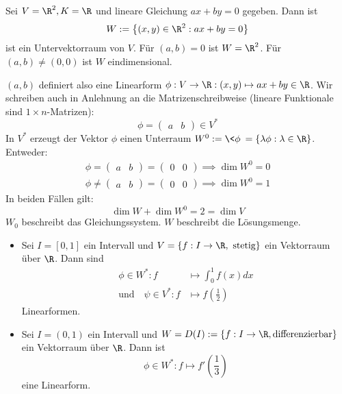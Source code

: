 \documentclass{mycourse}
\begin{document}
\begin{ex}
Sei $V=\R^2, K=\R$ und lineare Gleichung $ax+by=0$ gegeben.
Dann ist
\[
W:=\left\{(x, y) \in \R^2:ax+by=0\right\}
\]
ist ein Untervektorraum von $V$. 
Für $(a,b)=0$ ist $W=\R^2$.
Für $(a,b)\neq (0,0)$ ist $W$ eindimensional.

$(a,b)$ definiert also eine Linearform $\phi:V\to\R:(x,y)\mapsto ax+by\in\R$.
Wir schreiben auch in Anlehnung an die Matrizenschreibweise (lineare Funktionale sind $1\times n$-Matrizen):
\[
	\phi=\begin{pmatrix}a&b\end{pmatrix}\in V^*
\]
In $V^*$ erzeugt der Vektor $\phi$ einen Unterraum $W^0:=\<\phi\>=\{\lambda\phi:\lambda\in\R\}$.
Entweder:
\begin{align*}
	\phi=\begin{pmatrix}a&b\end{pmatrix}=\begin{pmatrix}0&0\end{pmatrix} \implies \dim W^0=0\\
\phi\neq \begin{pmatrix}a&b\end{pmatrix}=\begin{pmatrix}0&0\end{pmatrix}\implies \dim W^0=1
\end{align*}
In beiden Fällen gilt: 
\[
	\dim W +\dim W^0 =2=\dim V
\]
$W_0$ beschreibt das Gleichungssystem. 
$W$ beschreibt die Lösungsmenge.
\end{ex}
\begin{ex}
\begin{itemize}
\item
Sei $I=[0,1]$ ein Intervall und $V=\{f:I\to\R, \text{ stetig}\}$ ein Vektorraum über $\R$.
Dann sind
\begin{align*}
	\phi\in W^*:f &\mapsto \int_0^1f(x)dx\\
	\text{und}\quad \psi\in V^*:f&\mapsto f\left(\frac 12\right)
\end{align*}
Linearformen.
\item
Sei $I=(0,1)$ ein Intervall und $W=D(I):=\{f:I\to\R, \text{differenzierbar}\}$ ein Vektorraum über $\R$.
Dann ist
\[
	\phi\in W^*:f\mapsto f'\left(\frac 13\right)
\]
eine Linearform.
\end{itemize}
\end{ex}
\end{document}
